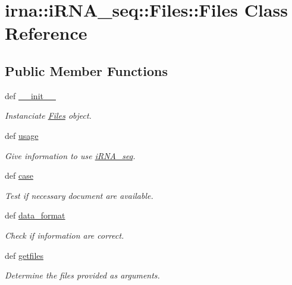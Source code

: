 \hypertarget{classirna_1_1iRNA__seq_1_1Files_1_1Files}{
\section{irna\-:\-:i\-R\-N\-A\-\_\-seq\-:\-:\-Files\-:\-:\-Files \-Class \-Reference}
\label{classirna_1_1iRNA__seq_1_1Files_1_1Files}
}
\subsection*{\-Public \-Member \-Functions}
\begin{DoxyCompactItemize}
\item 
def \hyperlink{classirna_1_1iRNA__seq_1_1Files_1_1Files_a49fe7a15556933526cca4a921d804a6a}{\-\_\-\-\_\-init\-\_\-\-\_\-}
\begin{DoxyCompactList}\small\item\em \-Instanciate \hyperlink{classirna_1_1iRNA__seq_1_1Files_1_1Files}{\-Files} object. \end{DoxyCompactList}\item 
def \hyperlink{classirna_1_1iRNA__seq_1_1Files_1_1Files_a334b5228c0e85f836d34f992c3d84b9e}{usage}
\begin{DoxyCompactList}\small\item\em \-Give information to use \hyperlink{namespaceirna_1_1iRNA__seq_1_1iRNA__seq}{i\-R\-N\-A\-\_\-seq}. \end{DoxyCompactList}\item 
def \hyperlink{classirna_1_1iRNA__seq_1_1Files_1_1Files_ac897181f501246c06a84b2ba1fcb8d8a}{case}
\begin{DoxyCompactList}\small\item\em \-Test if necessary document are available. \end{DoxyCompactList}\item 
def \hyperlink{classirna_1_1iRNA__seq_1_1Files_1_1Files_a91a4eddf2432cb414f188e4e63568beb}{data\-\_\-format}
\begin{DoxyCompactList}\small\item\em \-Check if information are correct. \end{DoxyCompactList}\item 
def \hyperlink{classirna_1_1iRNA__seq_1_1Files_1_1Files_a8a253ea2d7ada07e3fc4de10330df45b}{getfiles}
\begin{DoxyCompactList}\small\item\em \-Determine the files provided as arguments. \end{DoxyCompactList}\end{DoxyCompactItemize}
